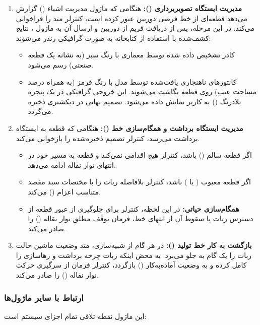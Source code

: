 \documentclass{article}
\begin{document}
\begin{enumerate}
	\item \textbf{مدیریت ایستگاه تصویربرداری ():}
	هنگامی که ماژول مدیریت اشیاء () گزارش می‌دهد قطعه‌ای از خط فرضی دوربین عبور کرده است، کنترلر متد  را فراخوانی می‌کند. در این مرحله، پس از دریافت فریم از دوربین و ارسال آن به ماژول ، نتایج کشف‌شده با استفاده از کتابخانه  به صورت گرافیکی رندر می‌شوند:
	\begin{itemize}
		\item کادر تشخیص داده شده توسط معماری  با رنگ سبز (به نشانه یک قطعه صنعتی) رسم می‌شود.
		\item کانتورهای ناهنجاری یافت‌شده توسط مدل  با رنگ قرمز (به همراه درصد مساحت عیب) روی قطعه نگاشت می‌شوند. این خروجی گرافیکی در یک پنجره بلادرنگ () به کاربر نمایش داده می‌شود. تصمیم نهایی در دیکشنری  ذخیره می‌گردد.
	\end{itemize}
	
	\item \textbf{مدیریت ایستگاه برداشت و همگام‌سازی خط ():}
	هنگامی که قطعه به ایستگاه برداشت می‌رسد، کنترلر تصمیم ذخیره‌شده را بازخوانی می‌کند.
	\begin{itemize}
		\item اگر قطعه سالم () باشد، کنترلر هیچ اقدامی نمی‌کند و قطعه به مسیر خود در انتهای نوار نقاله ادامه می‌دهد.
		\item اگر قطعه معیوب ( یا ) باشد، کنترلر بلافاصله ربات را با مختصات سبد مقصد متناسب اعزام () می‌کند.
		\item \textbf{همگام‌سازی حیاتی:} در این لحظه، کنترلر برای جلوگیری از عبور قطعه از دسترس ربات یا سقوط آن از انتهای خط، فرمان توقف مطلق نوار نقاله () را صادر می‌کند.
	\end{itemize}
	
	\item \textbf{بازگشت به کار خط تولید ():}
	در هر گام از شبیه‌سازی، متد  وضعیت ماشین حالت ربات را یک گام به جلو می‌برد. به محض اینکه ربات چرخه برداشت و رهاسازی را کامل کرده و به وضعیت آماده‌به‌کار () بازگردد، کنترلر فرمان از سرگیری حرکت نوار نقاله () را صادر می‌کند.
\end{enumerate}

\subsubsection{ارتباط با سایر ماژول‌ها}
این ماژول نقطه تلاقی تمام اجزای سیستم است:
\end{document}
